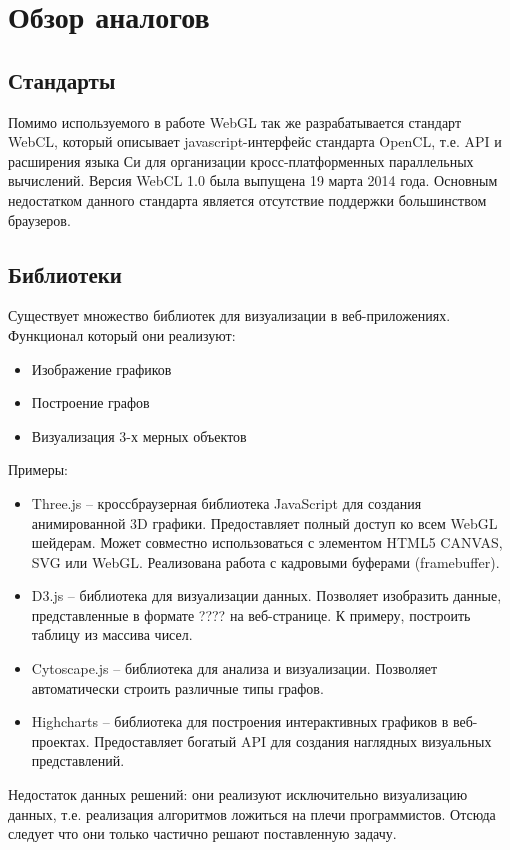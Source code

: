 \newpage
\section{Обзор аналогов}

\subsection{Стандарты}

Помимо используемого в работе WebGL так же разрабатывается стандарт WebCL, который описывает 
javascript-интерфейс стандарта OpenCL, т.е. API и расширения языка Си для организации
кросс-платформенных параллельных вычислений. Версия WebCL 1.0 была выпущена 19 марта 2014 года.
Основным недостатком данного стандарта является отсутствие поддержки большинством браузеров.

\subsection{Библиотеки}
Существует множество библиотек для визуализации в веб-приложениях. Функционал который они реализуют:
\begin{itemize}
  \item Изображение графиков
  \item Построение графов
  \item Визуализация 3-х мерных объектов
\end{itemize}

Примеры:
\begin{itemize}
  \item Three.js -- кроссбраузерная библиотека JavaScript для создания анимированной 3D графики.
    Предоставляет полный доступ ко всем WebGL шейдерам. Может совместно использоваться с элементом
    HTML5 CANVAS, SVG или WebGL. Реализована работа с кадровыми буферами (framebuffer).

  \item D3.js -- библиотека для визуализации данных. Позволяет изобразить данные, представленные в
    формате ???? на веб-странице. К примеру, построить таблицу из массива чисел.
    
  \item Cytoscape.js -- библиотека для анализа и визуализации. Позволяет автоматически 
    строить различные типы графов.

  \item Highcharts -- библиотека для построения интерактивных графиков в веб-проектах. Предоставляет
    богатый API для создания наглядных визуальных представлений.
\end{itemize}

Недостаток данных решений: они реализуют исключительно визуализацию данных, т.е. реализация
алгоритмов ложиться на плечи программистов. Отсюда следует что они только частично решают поставленную
задачу.
